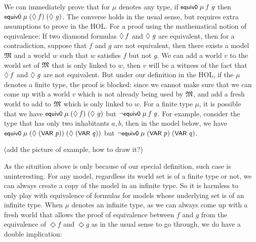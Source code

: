 \documentclass[letterpaper]{article}
\renewcommand{\HOLConst}[1]{{\textsf{\upshape\small #1}}}
\renewcommand{\HOLinline}[1]{\ensuremath{#1}}
\begin{document}
We can immediately prove that for $\mu$ denotes any type, if \HOLinline{\HOLConst{equiv0}\;\HOLFreeVar{\ensuremath{\mu}}\;\HOLFreeVar{f}\;\HOLFreeVar{g}} then \HOLinline{\HOLConst{equiv0}\;\HOLFreeVar{\ensuremath{\mu}}\;(\HOLSymConst{\ensuremath{\Diamond}}\;\HOLFreeVar{f})\;(\HOLSymConst{\ensuremath{\Diamond}}\;\HOLFreeVar{g})}. The converse holds in the usual sense, but requires extra assumptions to prove in the HOL. For a proof using the mathematical notion of equivalence: If two diamond formulas \HOLinline{\HOLSymConst{\ensuremath{\Diamond}}\;\HOLFreeVar{f}} and \HOLinline{\HOLSymConst{\ensuremath{\Diamond}}\;\HOLFreeVar{g}} are equivalent, then for a contradiction, suppose that $f$ and $g$ are not equivalent, then there exists a model \HOLinline{\HOLFreeVar{\ensuremath{\mathfrak{M}}}} and a world $w$ such that $w$ satisfies $f$ but not $g$. We can add a world $v$ to the world set of \HOLinline{\HOLFreeVar{\ensuremath{\mathfrak{M}}}} that is only linked to $w$, then $v$ will be a witness of the fact that \HOLinline{\HOLSymConst{\ensuremath{\Diamond}}\;\HOLFreeVar{f}} and \HOLinline{\HOLSymConst{\ensuremath{\Diamond}}\;\HOLFreeVar{g}} are not equivalent. But under our definition in the HOL, if the $\mu$ denotes a finite type, the proof is blocked: since we cannot make sure that we can come up with a world $v$ which is not already being used by \HOLinline{\HOLFreeVar{\ensuremath{\mathfrak{M}}}}, and add a fresh world to add to \HOLinline{\HOLFreeVar{\ensuremath{\mathfrak{M}}}} which is only linked to $w$. For a finite type $\mu$, it is possible that we have \HOLinline{\HOLConst{equiv0}\;\HOLFreeVar{\ensuremath{\mu}}\;(\HOLSymConst{\ensuremath{\Diamond}}\;\HOLFreeVar{f})\;(\HOLSymConst{\ensuremath{\Diamond}}\;\HOLFreeVar{g})} but \HOLinline{\HOLSymConst{\HOLTokenNeg{}}\HOLConst{equiv0}\;\HOLFreeVar{\ensuremath{\mu}}\;\HOLFreeVar{f}\;\HOLFreeVar{g}}. For example, consider the type that has only two inhabitants $a,b$, then in the model below, we have \HOLinline{\HOLConst{equiv0}\;\HOLFreeVar{\ensuremath{\mu}}\;(\HOLSymConst{\ensuremath{\Diamond}}\;(\HOLConst{VAR}\;\HOLFreeVar{p}))\;(\HOLSymConst{\ensuremath{\Diamond}}\;(\HOLConst{VAR}\;\HOLFreeVar{q}))} but \HOLinline{\HOLSymConst{\HOLTokenNeg{}}\HOLConst{equiv0}\;\HOLFreeVar{\ensuremath{\mu}}\;(\HOLConst{VAR}\;\HOLFreeVar{p})\;(\HOLConst{VAR}\;\HOLFreeVar{q})}.

(add the picture of example, how to draw it?)%

As the situition above is only because of our special definition, such case is uninteresting. For any model, regardless its world set is of a finite type or not, we can always create a copy of the model in an infinite type. So it is harmless to only play with equivalence of formulas for models whose underlying set is of an infinite type. When $\mu$ denotes an infinite type, as we can always come up with a fresh world that allows the proof of equivalence between $f$ and $g$ from the equivalence of $\Diamond f$ and $\Diamond g$ as in the usual sense to go through, we do have a double implication:
\end{document}
